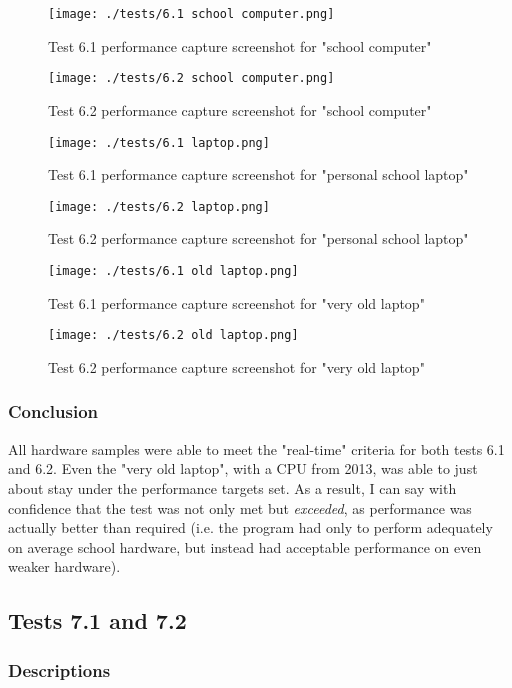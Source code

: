 \label{sec:evidence6}
\begin{figure}[H]
	\centering
	\texttt{[image: ./tests/6.1 school computer.png]}
	\caption{Test 6.1 performance capture screenshot for "school computer"}
\end{figure}
\begin{figure}[H]
	\centering
	\texttt{[image: ./tests/6.2 school computer.png]}
	\caption{Test 6.2 performance capture screenshot for "school computer"}
\end{figure}
\begin{figure}[H]
	\centering
	\texttt{[image: ./tests/6.1 laptop.png]}
	\caption{Test 6.1 performance capture screenshot for "personal school laptop"}
\end{figure}
\begin{figure}[H]
	\centering
	\texttt{[image: ./tests/6.2 laptop.png]}
	\caption{Test 6.2 performance capture screenshot for "personal school laptop"}
\end{figure}
\begin{figure}[H]
	\centering
	\texttt{[image: ./tests/6.1 old laptop.png]}
	\caption{Test 6.1 performance capture screenshot for "very old laptop"}
\end{figure}
\begin{figure}[H]
	\centering
	\texttt{[image: ./tests/6.2 old laptop.png]}
	\caption{Test 6.2 performance capture screenshot for "very old laptop"}
\end{figure}

\subsubsection*{Conclusion}
All hardware samples were able to meet the "real-time" criteria for both tests 6.1 and 6.2. Even the "very old laptop", with a CPU from 2013, was able to just about stay under the performance targets set. As a result, I can say with confidence that the test was not only met but \textit{exceeded}, as performance was actually better than required (i.e. the program had only to perform adequately on average school hardware, but instead had acceptable performance on even weaker hardware).

\pagebreak
\subsection{Tests 7.1 and 7.2}
\subsubsection*{Descriptions}
